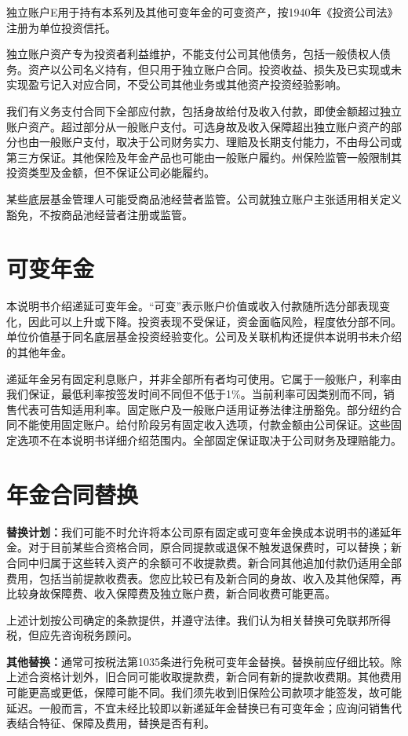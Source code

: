 \documentclass[UTF8,fontset=none,11pt,a4paper]{ctexart}
\begin{document}
独立账户E用于持有本系列及其他可变年金的可变资产，按1940年《投资公司法》注册为单位投资信托。


独立账户资产专为投资者利益维护，不能支付公司其他债务，包括一般债权人债务。资产以公司名义持有，但只用于独立账户合同。投资收益、损失及已实现或未实现盈亏记入对应合同，不受公司其他业务或其他资产投资经验影响。


我们有义务支付合同下全部应付款，包括身故给付及收入付款，即使金额超过独立账户资产。超过部分从一般账户支付。可选身故及收入保障超出独立账户资产的部分也由一般账户支付，取决于公司财务实力、理赔及长期支付能力，不由母公司或第三方保证。其他保险及年金产品也可能由一般账户履约。州保险监管一般限制其投资类型及金额，但不保证公司必能履约。


某些底层基金管理人可能受商品池经营者监管。公司就独立账户主张适用相关定义豁免，不按商品池经营者注册或监管。


\section*{可变年金}
本说明书介绍递延可变年金。“可变”表示账户价值或收入付款随所选分部表现变化，因此可以上升或下降。投资表现不受保证，资金面临风险，程度依分部不同。单位价值基于同名底层基金投资经验变化。公司及关联机构还提供本说明书未介绍的其他年金。


递延年金另有固定利息账户，并非全部所有者均可使用。它属于一般账户，利率由我们保证，最低利率按签发时间不同但不低于1\%。当前利率可因类别而不同，销售代表可告知适用利率。固定账户及一般账户适用证券法律注册豁免。部分纽约合同不能使用固定账户。给付阶段另有固定收入选项，付款金额由公司保证。这些固定选项不在本说明书详细介绍范围内。全部固定保证取决于公司财务及理赔能力。


\section*{年金合同替换}
\textbf{替换计划：}我们可能不时允许将本公司原有固定或可变年金换成本说明书的递延年金。对于目前某些合资格合同，原合同提款或退保不触发退保费时，可以替换；新合同中归属于这些转入资产的余额可不收提款费。新合同其他追加付款仍适用全部费用，包括当前提款收费表。您应比较已有及新合同的身故、收入及其他保障，再比较身故保障费、收入保障费及独立账户费，新合同收费可能更高。


上述计划按公司确定的条款提供，并遵守法律。我们认为相关替换可免联邦所得税，但应先咨询税务顾问。


\textbf{其他替换：}通常可按税法第1035条进行免税可变年金替换。替换前应仔细比较。除上述合资格计划外，旧合同可能收取提款费，新合同有新的提款收费期。其他费用可能更高或更低，保障可能不同。我们须先收到旧保险公司款项才能签发，故可能延迟。一般而言，不宜未经比较即以新递延年金替换已有可变年金；应询问销售代表结合特征、保障及费用，替换是否有利。
\end{document}
